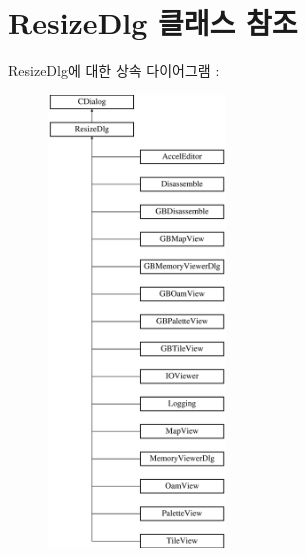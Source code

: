 \hypertarget{class_resize_dlg}{}\section{Resize\+Dlg 클래스 참조}
\label{class_resize_dlg}
Resize\+Dlg에 대한 상속 다이어그램 \+: \begin{figure}[H]
\begin{center}
\leavevmode
\includegraphics[height=12.000000cm]{class_resize_dlg}
\end{center}
\end{figure}
